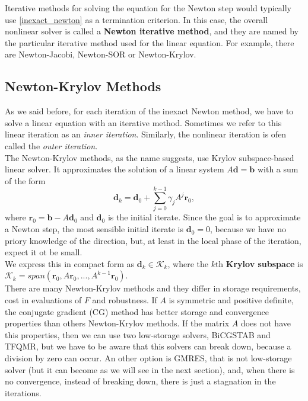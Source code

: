 Iterative methods for solving the equation for the Newton step would typically use \eqref{inexact_newton} as a termination criterion. In this case, the overall nonlinear solver is called a \textbf{Newton iterative method}, and they are named by the particular iterative method used for the linear equation. For example, there are Newton-Jacobi, Newton-SOR or Newton-Krylov.\\

\subsection{Newton-Krylov Methods} 
As we said before, for each iteration of the inexact Newton method, we have to solve a linear equation with an iterative method. Sometimes we refer to this linear iteration as an \textit{inner iteration}. Similarly, the nonlinear iteration is ofen called the \textit{outer iteration}.\\
The Newton-Krylov methods, as the name suggests, use Krylov subspace-based linear solver. It approximates the solution of a linear system $A\textbf{d}=\textbf{b}$ with a sum of the form 
\begin{equation*}
\textbf{d}_k=\textbf{d}_0+\sum_{j=0}^{k-1}\gamma_j A^j\textbf{r}_0,
\end{equation*}
where $\textbf{r}_0=\textbf{b}-A\textbf{d}_0$ and $\textbf{d}_0$ is the initial iterate. Since the goal is to approximate a Newton step, the most sensible initial iterate is $\textbf{d}_0=0$, because we have no priory knowledge of the direction, but, at least in the local phase of the iteration, expect it ot be small.\\
 We express this in compact form as $ \textbf{d}_k \in \mathcal{K}_k$, where the $k$th \textbf{Krylov subspace} is $\mathcal{K}_k = span  (\textbf{r}_0, A\textbf{r}_0, ...,A^{k-1}\textbf{r}_0)$.\\
 There are many Newton-Krylov methods and they differ in storage requirements, cost in evaluations of $F$ and robustness. If $A$ is symmetric and positive definite, the conjugate gradient (CG) method has better storage and convergence properties than others Newton-Krylov methods. If the matrix $A$ does not have this properties, then we can use two low-storage solvers, BiCGSTAB and TFQMR, but we have to be aware that this solvers can break down, because a division by zero can occur. An other option is GMRES, that is not low-storage solver (but it can become as we will see in the next section), and, when there is no convergence, instead of breaking down, there is just a stagnation in the iterations.

